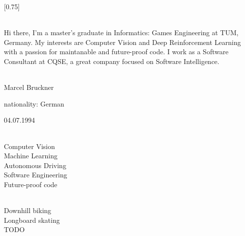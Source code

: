 \documentclass[lighthipster]{simplehipstercv}
\newcommand{\todo}{{\color{red}TODO\xspace}}
\begin{document}
\setlength{\columnsep}{1.5cm}
[0.75]
\begin{paracol}{2}

    \paracolbackgroundoptions



    \footnotesize
    {\setasidefontcolour
    \flushright
    \begin{center}
    \end{center}

    \\[0.5em]

    {\footnotesize
    Hi there, I'm a master's graduate in Informatics: Games Engineering at TUM, Germany. My interests are Computer Vision and Deep Reinforcement Learning with a passion for maintanable and future-proof code. I work as a Software Consultant at CQSE, a great company focused on Software Intelligence.
    }
    \bigskip

     \\[0.5em]
    Marcel Bruckner

    nationality: German

    04.07.1994

    \bigskip

     \\[0.5em]

    Computer Vision
    \\
    Machine Learning
    \\
    Autonomous Driving
    \\
    Software Engineering
    \\
    Future-proof code


    \bigskip



    \bigskip

    \\[0.5em]

    Downhill biking
    \\
    Longboard skating
    \\
    \todo


    \bigskip

}
\end{paracol}
\end{document}
